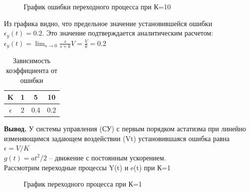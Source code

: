 \documentclass[a4paper, 11pt]{article}
\begin{document}
\begin{figure}[h!]
    \caption{График ошибки переходного процесса при К=10}
    \label{tree}
\end{figure}

Из графика видно, что предельное значение установившейся ошибки $\epsilon_y(t)=0.2$. Это значение подтверждается аналитическим расчетом: $\epsilon_y(t)=\lim_{s\to0}\frac{s}{s+k}V=\frac{V}{k}=0.2$\\

\begin{table}[h]
    \begin{center}
    \begin{tabular}{|c|c|c|c|}
    \hline
         K & 1 & 5 & 10 \\
         \hline
         $\epsilon$ & 2 & 0.4 & 0.2 \\
    \hline     
    \end{tabular}
    \caption{Зависимость коэффициента от ошибки}
    \label{tab:my_label}
    \end{center}
\end{table}

\textbf{Вывод.} У системы управления (СУ) с первым порядком астатизма при линейно изменяющимся задающем воздействии (Vt) установившаяся ошибка равна $\epsilon=V/K$\\


$g(t)=at^2/2$ – движение с постоянным ускорением.\\

Рассмотрим переходные процессы Y(t) и e(t) при К=1


\begin{figure}[h!]
    \caption{График переходного процесса при К=1}
    \label{two}
\end{figure}
\end{document}
